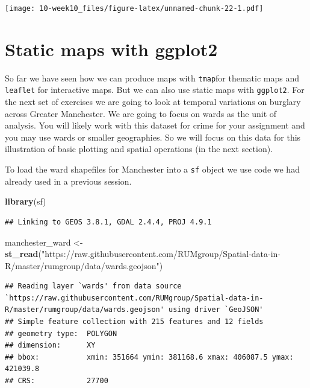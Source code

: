 \documentclass[]{book}
\newenvironment{Shaded}{\begin{snugshade}}{\end{snugshade}}
\newcommand{\KeywordTok}[1]{\textcolor[rgb]{0.13,0.29,0.53}{\textbf{#1}}}
\newcommand{\NormalTok}[1]{#1}
\newcommand{\StringTok}[1]{\textcolor[rgb]{0.31,0.60,0.02}{#1}}
\begin{document}
\texttt{[image: 10-week10\_files/figure-latex/unnamed-chunk-22-1.pdf]}

\hypertarget{static-maps-with-ggplot2}{%
\section{Static maps with ggplot2}\label{static-maps-with-ggplot2}}

So far we have seen how we can produce maps with \texttt{tmap}for thematic maps and \texttt{leaflet} for interactive maps. But we can also use static maps with \texttt{ggplot2}. For the next set of exercises we are going to look at temporal variations on burglary across Greater Manchester. We are going to focus on wards as the unit of analysis. You will likely work with this dataset for crime for your assignment and you may use wards or smaller geographies. So we will focus on this data for this illustration of basic plotting and spatial operations (in the next section).

To load the ward shapefiles for Manchester into a \texttt{sf} object we use code we had already used in a previous session.

\begin{Shaded}
\begin{Highlighting}[]
\KeywordTok{library}\NormalTok{(sf)}
\end{Highlighting}
\end{Shaded}

\begin{verbatim}
## Linking to GEOS 3.8.1, GDAL 2.4.4, PROJ 4.9.1
\end{verbatim}

\begin{Shaded}
\begin{Highlighting}[]
\NormalTok{manchester_ward <-}\StringTok{ }\KeywordTok{st_read}\NormalTok{(}\StringTok{"https://raw.githubusercontent.com/RUMgroup/Spatial-data-in-R/master/rumgroup/data/wards.geojson"}\NormalTok{)}
\end{Highlighting}
\end{Shaded}

\begin{verbatim}
## Reading layer `wards' from data source `https://raw.githubusercontent.com/RUMgroup/Spatial-data-in-R/master/rumgroup/data/wards.geojson' using driver `GeoJSON'
## Simple feature collection with 215 features and 12 fields
## geometry type:  POLYGON
## dimension:      XY
## bbox:           xmin: 351664 ymin: 381168.6 xmax: 406087.5 ymax: 421039.8
## CRS:            27700
\end{verbatim}
\end{document}
